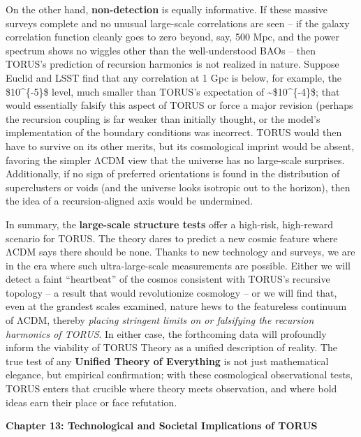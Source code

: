 \documentclass[
]{article}
\begin{document}
On the other hand, \textbf{non-detection} is equally informative. If
these massive surveys complete and no unusual large-scale correlations
are seen -- if the galaxy correlation function cleanly goes to zero
beyond, say, 500 Mpc, and the power spectrum shows no wiggles other than
the well-understood BAOs -- then TORUS's prediction of recursion
harmonics is not realized in nature. Suppose Euclid and LSST find that
any correlation at 1 Gpc is below, for example, the \$10\^{}\{-5\}\$
level, much smaller than TORUS's expectation of
\textasciitilde\$10\^{}\{-4\}\$; that would essentially falsify this
aspect of TORUS or force a major revision (perhaps the recursion
coupling is far weaker than initially thought, or the model's
implementation of the boundary conditions was incorrect. TORUS would
then have to survive on its other merits, but its cosmological imprint
would be absent, favoring the simpler ΛCDM view that the universe has no
large-scale surprises. Additionally, if no sign of preferred
orientations is found in the distribution of superclusters or voids (and
the universe looks isotropic out to the horizon), then the idea of a
recursion-aligned axis would be undermined.

In summary, the \textbf{large-scale structure tests} offer a high-risk,
high-reward scenario for TORUS. The theory dares to predict a new cosmic
feature where ΛCDM says there should be none. Thanks to new technology
and surveys, we are in the era where such ultra-large-scale measurements
are possible. Either we will detect a faint ``heartbeat'' of the cosmos
consistent with TORUS's recursive topology -- a result that would
revolutionize cosmology -- or we will find that, even at the grandest
scales examined, nature hews to the featureless continuum of ΛCDM,
thereby \emph{placing stringent limits on or falsifying the recursion
harmonics of TORUS}. In either case, the forthcoming data will
profoundly inform the viability of TORUS Theory as a unified description
of reality. The true test of any \textbf{Unified Theory of Everything}
is not just mathematical elegance, but empirical confirmation; with
these cosmological observational tests, TORUS enters that crucible where
theory meets observation, and where bold ideas earn their place or face
refutation.

\textbf{Chapter 13: Technological and Societal Implications of TORUS}
\end{document}
